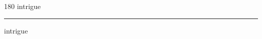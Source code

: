 
\begin{frame}
\begin{center}
\begin{turn}{180}
{\fontsize{2.5cm}{1em}\selectfont intrigue}
\end{turn}
\vspace{1em}\par  
\hrule
\vspace{1em}\par  
{\fontsize{2.5cm}{1em}\selectfont intrigue}
\end{center}
\end{frame}
